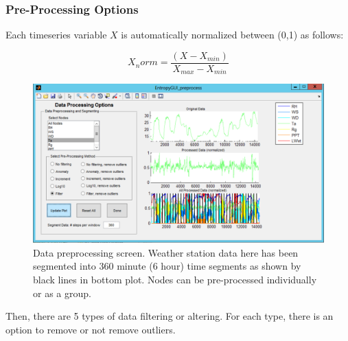 \documentclass[a4paper]{article}
\begin{document}
\subsubsection{Pre-Processing Options}
Each timeseries variable $X$ is automatically normalized between (0,1) as follows:

\begin{equation}
X_norm = \frac{(X-X_{min})}{X_{max}-X_{min}}
\end{equation}


\begin{figure}[h!]\label{fig:preprocess}
\begin{center}
\includegraphics[scale=.5]{Image_Preprocess.pdf}
\caption{Data preprocessing screen.  Weather station data here has been segmented into 360 minute (6 hour) time segments as shown by black lines in bottom plot.  Nodes can be pre-processed individually or as a group.}
\end{center}
\end{figure}

Then, there are 5 types of data filtering or altering.  For each type, there is an option to remove or not remove outliers.
\end{document}

